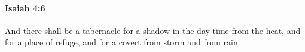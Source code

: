 
		\paragraph{Isaiah 4:6} %
			\label{ISAIAH-4-6}

			And there shall be a tabernacle for a shadow in the day time from the heat, and for a place of refuge, and for a covert from storm and from rain.

